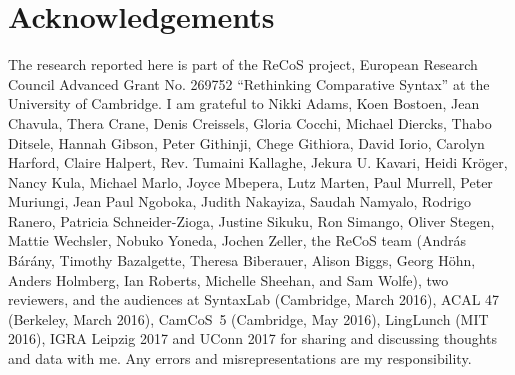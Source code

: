 \documentclass[output=paper
,modfonts
,nonflat]{langsci/langscibook}
\begin{document}
\section*{Acknowledgements}
The research reported here is part of the ReCoS project, European Research Council Advanced Grant No. 269752 ``Rethinking Comparative Syntax'' at the University of Cambridge. I am grateful to Nikki Adams, Koen Bostoen, Jean Chavula, Thera Crane, Denis Creissels, Gloria Cocchi, Michael Diercks, Thabo Ditsele, Hannah Gibson, Peter Githinji, Chege Githiora, David Iorio, Carolyn Harford, Claire Halpert, Rev. Tumaini Kallaghe, Jekura U. Kavari, Heidi Kröger, Nancy Kula, Michael Marlo, Joyce Mbepera, Lutz Marten, Paul Murrell, Peter Muriungi, Jean Paul Ngoboka, Judith Nakayiza, Saudah Namyalo, Rodrigo Ranero, Patricia Schneider-Zioga, Justine Sikuku, Ron Simango, Oliver Stegen, Mattie Wechsler, Nobuko Yoneda, Jochen Zeller, the ReCoS team (András Bárány, Timothy Bazalgette, Theresa Biberauer, Alison Biggs, Georg Höhn, Anders Holmberg, Ian Roberts, Michelle Sheehan, and Sam Wolfe), two reviewers, and the audiences at SyntaxLab (Cambridge, March 2016), ACAL 47 (Berkeley, March 2016), CamCoS~5 (Cambridge, May 2016), LingLunch (MIT 2016), IGRA Leipzig 2017 and UConn 2017 for sharing and discussing thoughts and data with me. Any errors and misrepresentations are my responsibility.

{\sloppy\printbibliography[heading=subbibliography,notkeyword=this]}
\end{document}
